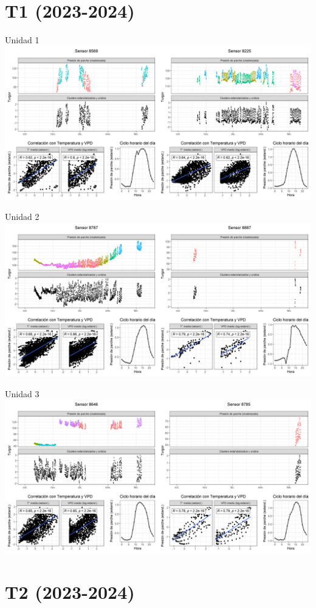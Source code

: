 \documentclass[
  letterpaper,
  DIV=11,
  numbers=noendperiod]{scrreprt}
\begin{document}
\chapter{T1 (2023-2024)}

Unidad 1
\includegraphics{figuras/03_turgor_union/2023_2024_La_Esperanza_T1_Unidad_1.png}

Unidad 2
\includegraphics{figuras/03_turgor_union/2023_2024_La_Esperanza_T1_Unidad_2.png}

Unidad 3
\includegraphics{figuras/03_turgor_union/2023_2024_La_Esperanza_T1_Unidad_3.png}

\chapter{T2 (2023-2024)}
\end{document}
